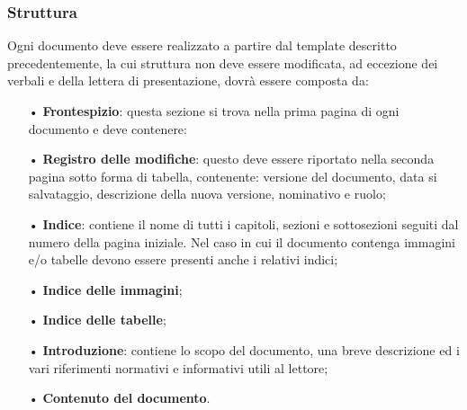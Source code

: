 \subsubsection{Struttura}
Ogni documento deve essere realizzato a partire dal template descritto precedentemente, la cui struttura non deve essere modificata, ad eccezione dei verbali e della lettera di presentazione, dovrà essere composta da:
\begin{itemize}
\item[•] \textbf{Frontespizio}: questa sezione si trova nella prima pagina di ogni documento e deve contenere:
\item[•] \textbf{Registro delle modifiche}: questo deve essere riportato nella seconda pagina sotto forma di tabella, contenente: versione del documento, data si salvataggio, descrizione della nuova versione, nominativo e ruolo;
\item[•] \textbf{Indice}: contiene il nome di tutti i capitoli, sezioni e sottosezioni seguiti dal numero della pagina iniziale. Nel caso in cui il documento contenga immagini e/o tabelle devono essere presenti anche i relativi indici;
\item[•] \textbf{Indice delle immagini};
\item[•] \textbf{Indice delle tabelle};
\item[•] \textbf{Introduzione}: contiene lo scopo del documento, una breve descrizione ed i vari riferimenti normativi e informativi utili al lettore;
\item[•] \textbf{Contenuto del documento}.
\end{itemize}




